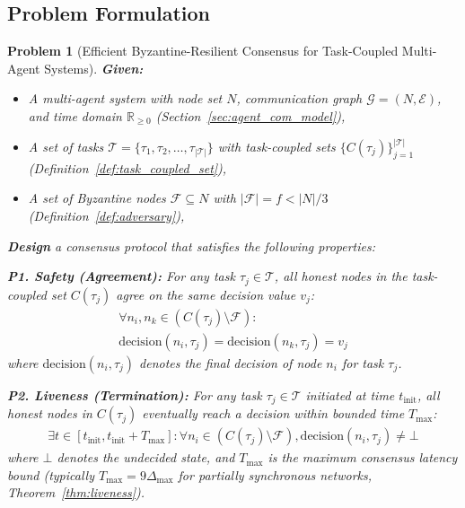 \documentclass[lettersize,journal]{IEEEtran}
\newtheorem{problem}{Problem}
\begin{document}
\subsection{Problem Formulation}
\label{sec:problem_formulation}

\begin{problem}[Efficient Byzantine-Resilient Consensus for Task-Coupled Multi-Agent Systems]
\label{prob:main}
\textbf{Given:}
\begin{itemize}
    \item A multi-agent system with node set $N$, communication graph 
          $\mathcal{G} = (N, \mathcal{E})$, and time domain $\mathbb{R}_{\geq 0}$ 
          (Section~\ref{sec:agent_com_model}),
    \item A set of tasks $\mathcal{T} = \{\tau_1, \tau_2, \ldots, \tau_{|\mathcal{T}|}\}$ 
          with task-coupled sets $\{C(\tau_j)\}_{j=1}^{|\mathcal{T}|}$ 
          (Definition~\ref{def:task_coupled_set}),
	\item A set of Byzantine nodes $\mathcal{F} \subseteq N$ with 
		  $|\mathcal{F}| = f < |N|/3$ 
		  (Definition~\ref{def:adversary}),
\end{itemize}

\noindent \textbf{Design} a consensus protocol that satisfies the following 
properties:

\vspace{0.3cm}
\noindent \textbf{P1. Safety (Agreement):} For any task $\tau_j \in \mathcal{T}$, 
all honest nodes in the task-coupled set $C(\tau_j)$ agree on the same 
decision value $v_j$:
\begin{equation}
\begin{aligned}
\forall n_i, n_k \in (C(\tau_j) \setminus \mathcal{F}): \\
\text{decision}(n_i, \tau_j) = \text{decision}(n_k, \tau_j) = v_j
\label{eq:safety}
\end{aligned}
\end{equation}
where $\text{decision}(n_i, \tau_j)$ denotes the final decision of node 
$n_i$ for task $\tau_j$.

\vspace{0.3cm}
\noindent \textbf{P2. Liveness (Termination):} For any task $\tau_j \in \mathcal{T}$ 
initiated at time $t_{\text{init}}$, all honest nodes in $C(\tau_j)$ 
eventually reach a decision within bounded time $T_{\max}$:
\begin{equation}
\begin{aligned}
\exists t \in [t_{\text{init}}, t_{\text{init}} + T_{\max}]: 
\forall n_i \in (C(\tau_j) \setminus \mathcal{F}), 
\text{decision}(n_i, \tau_j) \neq \bot
\label{eq:liveness}
\end{aligned}
\end{equation}
where $\bot$ denotes the undecided state, and $T_{\max}$ is the maximum 
consensus latency bound (typically $T_{\max} = 9\Delta_{\max}$ for 
partially synchronous networks, Theorem~\ref{thm:liveness}).


\end{problem}
\end{document}
